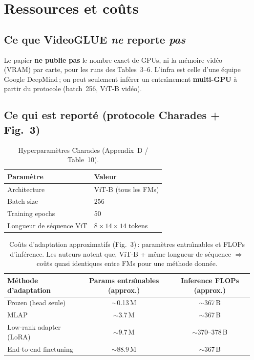 \documentclass[11pt,a4paper]{article}
\begin{document}
\section{Ressources et co\^{u}ts}

\subsection{Ce que VideoGLUE \emph{ne} reporte \emph{pas}}

Le papier \textbf{ne publie pas} le nombre exact de GPUs, ni la m\'emoire
vid\'eo (VRAM) par carte, pour les runs des Tables~3--6. L'infra est celle
d'une \'equipe Google DeepMind\,; on peut seulement inf\'erer un entra\^{\i}nement
\textbf{multi-GPU} \`a partir du protocole (batch~256, ViT-B vid\'eo).

\subsection{Ce qui est report\'e (protocole Charades + Fig.~3)}

\begin{table}[h]
\centering
\caption{Hyperparam\`etres Charades (Appendix~D / Table~10).}
\label{tab:charades-hp}
\small
\begin{tabular}{@{}ll@{}}
\toprule
Param\`etre & Valeur \\
\midrule
Architecture & ViT-B (tous les FMs) \\
Batch size & 256 \\
Training epochs & 50 \\
Longueur de s\'equence ViT & $8 \times 14 \times 14$ tokens \\
\bottomrule
\end{tabular}
\end{table}

\begin{table}[h]
\centering
\caption{Co\^{u}ts d'adaptation approximatifs (Fig.~3)\,: param\`etres entra\^{\i}nables
et FLOPs d'inf\'erence. Les auteurs notent que, ViT-B + m\^{e}me longueur de
s\'equence $\Rightarrow$ co\^{u}ts quasi identiques entre FMs pour une m\'ethode
donn\'ee.}
\label{tab:costs}
\small
\begin{tabular}{@{}lcc@{}}
\toprule
M\'ethode d'adaptation &
  Params entra\^{\i}nables (approx.) &
  Inference FLOPs (approx.) \\
\midrule
Frozen (head seule) & $\sim$0.13\,M & $\sim$367\,B \\
MLAP & $\sim$3.7\,M & $\sim$367\,B \\
Low-rank adapter (LoRA) & $\sim$9.7\,M & $\sim$370--378\,B \\
End-to-end finetuning & $\sim$88.9\,M & $\sim$367\,B \\
\bottomrule
\end{tabular}
\end{table}
\end{document}
